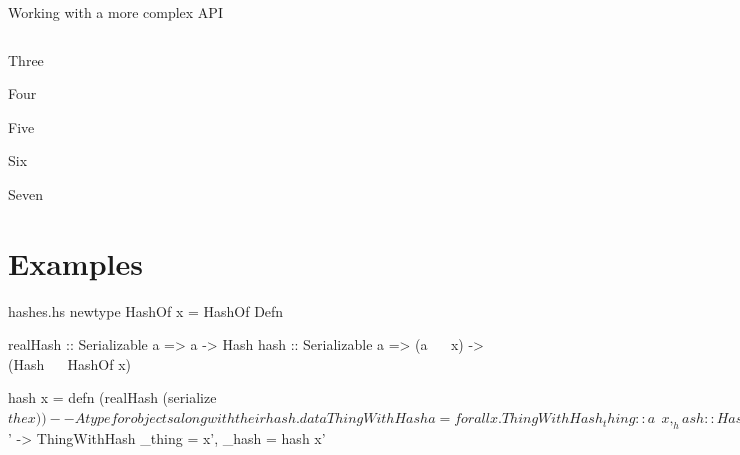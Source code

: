 \documentclass{beamer}
\begin{document}
\begin{frame}{Working with a more complex API}
\inputminted{haskell}{containers.hs}
\end{frame}

\begin{frame}{Three}

\end{frame}


\begin{frame}{Four}

\end{frame}

\begin{frame}{Five}

\end{frame}

\begin{frame}{Six}

\end{frame}


\begin{frame}{Seven}

\end{frame}

  \section{Examples}   %

\begin{filecontents*}{hashes.hs}
newtype HashOf x = HashOf Defn

realHash :: Serializable a =>  a       ->  Hash
hash     :: Serializable a => (a ~~ x) -> (Hash ~~ HashOf x)

hash x = defn (realHash (serialize $ the x))

-- A type for objects along with their hash.
data ThingWithHash a = forall x. ThingWithHash
  { _thing :: a    ~~ x
  , _hash  :: Hash ~~ HashOf x }

-- Use it like this:
hashIt :: Serializable a => a -> ThingWithHash a
hashIt x = name x $ \x' ->
  ThingWithHash { _thing = x', _hash = hash x' }
                          
    
\end{filecontents*}
\end{document}
